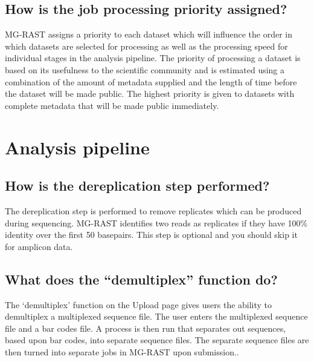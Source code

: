 \documentclass[12pt,fullpage]{report}
\begin{document}
\subsection*{How is the job processing priority assigned?}
MG-RAST assigns a priority to each dataset which will influence the order in which datasets are selected for processing as well as the processing speed for individual stages in the analysis pipeline. The priority of processing a dataset is based on its usefulness to the scientific community and is estimated using a combination of the amount of metadata supplied and the length of time before the dataset will be made public. The highest priority is given to datasets with complete metadata that will be made public immediately.
\section{Analysis pipeline}
\subsection*{How is the dereplication step performed?}
The dereplication step is performed to remove replicates which can be produced during sequencing. MG-RAST identifies two reads as replicates if they have 100\% identity over the first 50 basepairs. This step is optional and you should skip it for amplicon data.
\subsection*{What does the ``demultiplex'' function do?}
The `demultiplex' function on the Upload page gives users the ability to demultiplex a multiplexed sequence file. The user enters the multiplexed sequence file and a bar codes file. A process is then run that separates out sequences, based upon bar codes, into separate sequence files. The separate sequence files are then turned into separate jobs in MG-RAST upon submission..
\end{document}
